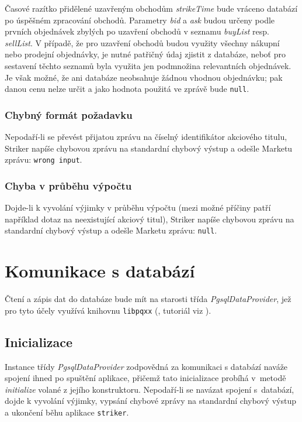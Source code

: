 \documentclass[thesis=M,czech]{FITthesis}[2012/06/26]
\begin{document}
Časové razítko přidělené uzavřeným obchodům \textit{strikeTime} bude vráceno databází po úspěšném zpracování 
obchodů. Parametry \textit{bid} a \textit{ask} budou určeny podle prvních objednávek zbylých po uzavření obchodů v seznamu 
\textit{buyList} resp. \textit{sellList}. V případě, že pro uzavření obchodů budou využity všechny nákupní nebo prodejní 
objednávky, je nutné patřičný údaj zjistit z databáze, neboť pro sestavení těchto seznamů byla využita jen podmnožina 
relevantních objednávek. Je však možné, že ani databáze neobsahuje žádnou vhodnou objednávku; pak danou cenu 
nelze určit a jako hodnota použitá ve zprávě bude \texttt{null}.


\subsubsection{Chybný formát požadavku}

Nepodaří-li se převést přijatou zprávu na číselný identifikátor akciového titulu, Striker napíše chybovou zprávu na standardní 
chybový výstup a odešle Marketu zprávu: \texttt{wrong input}.

\subsubsection{Chyba v průběhu výpočtu}

Dojde-li k vyvolání výjimky v průběhu výpočtu (mezi možné příčiny patří například dotaz na neexistující akciový titul), Striker 
napíše chybovou zprávu na standardní chybový výstup a odešle Marketu zprávu: \texttt{null}.



\section{Komunikace s databází}

Čtení a zápis dat do databáze bude mít na starosti třída \textit{PgsqlDataProvider}, jež pro tyto účely využívá knihovnu 
\texttt{libpqxx} (\cite{libpqxx}, tutoriál viz \cite{libpqxxtut}).


\subsection{Inicializace}

Instance třídy \textit{PgsqlDataProvider} zodpovědná za komunikaci s databází naváže spojení ihned po spuštění 
aplikace, přičemž tato inicializace probíhá v~metodě \textit{initialize} volané z jejího konstruktoru. Nepodaří-li se navázat spojení 
s~databází, dojde k vyvolání výjimky, vypsání chybové zprávy na standardní chybový výstup a ukončení běhu aplikace \texttt{striker}.
\end{document}
